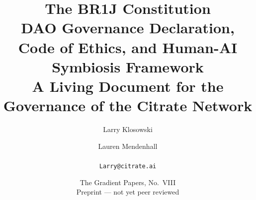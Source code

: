 
\title{\textbf{The BR1J Constitution}\\[3pt]
\large DAO Governance Declaration, Code of Ethics, and Human-AI Symbiosis Framework\\[2pt]
\normalsize A Living Document for the Governance of the Citrate Network}
\author{Larry Klosowski \and Lauren Mendenhall\\[2pt]\CitrateAffil\\ \texttt{Larry@citrate.ai}}
\date{The Gradient Papers, No.~VIII \\ Preprint --- not yet peer reviewed}
\maketitle
